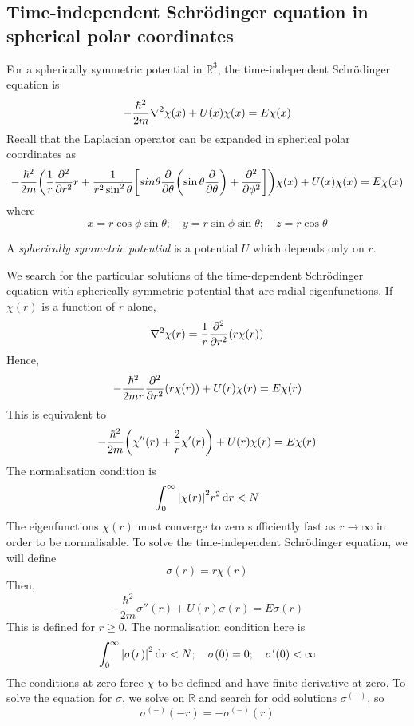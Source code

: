 \subsection{Time-independent Schr\"odinger equation in spherical polar coordinates}
For a spherically symmetric potential in \( \mathbb R^3 \), the time-independent Schr\"odinger equation is
\[
	-\frac{\hbar^2}{2m} \laplacian{\chi(x)} + U(x) \chi(x) = E\chi(x)
\]
Recall that the Laplacian operator can be expanded in spherical polar coordinates as
\[
	-\frac{\hbar^2}{2m} \qty( \frac{1}{r} \pdv[2]{r} r + \frac{1}{r^2\sin^2\theta}\qty[sin \theta \pdv{\theta}\qty(\sin\theta \pdv{\theta}) + \pdv[2]{\phi}] )\chi(x) + U(x) \chi(x) = E\chi(x)
\]
where
\[
	x = r \cos \phi \sin \theta; \quad y = r \sin \phi \sin \theta;\quad z = r \cos \theta
\]
\begin{definition}
	A \textit{spherically symmetric potential} is a potential \( U \) which depends only on \( r \).
\end{definition}
We search for the particular solutions of the time-dependent Schr\"odinger equation with spherically symmetric potential that are radial eigenfunctions.
If \( \chi(r) \) is a function of \( r \) alone,
\[
	\laplacian{\chi(r)} = \frac{1}{r} \pdv[2]{r} \qty(r\chi(r))
\]
Hence,
\[
	-\frac{\hbar^2}{2mr} \pdv[2]{r} \qty(r \chi(r)) + U(r) \chi(r) = E \chi(r)
\]
This is equivalent to
\[
	-\frac{\hbar^2}{2m} \qty( \chi''(r) + \frac{2}{r} \chi'(r) ) + U(r) \chi(r) = E \chi(r)
\]
The normalisation condition is
\[
	\int_0^\infty \abs{\chi(r)}^2 r^2 \dd{r} < N
\]
The eigenfunctions \( \chi(r) \) must converge to zero sufficiently fast as \( r \to \infty \) in order to be normalisable.
To solve the time-independent Schr\"odinger equation, we will define
\[
	\sigma(r) = r \chi(r)
\]
Then,
\[
	-\frac{\hbar^2}{2m} \sigma''(r) + U(r) \sigma(r) = E \sigma(r)
\]
This is defined for \( r \geq 0 \).
The normalisation condition here is
\[
	\int_0^\infty \abs{\sigma(r)}^2 \dd{r} < N;\quad \sigma(0) = 0;\quad \sigma'(0) < \infty
\]
The conditions at zero force \( \chi \) to be defined and have finite derivative at zero.
To solve the equation for \( \sigma \), we solve on \( \mathbb R \) and search for odd solutions \( \sigma^{(-)} \), so
\[
	\sigma^{(-)}(-r) = -\sigma^{(-)}(r)
\]

